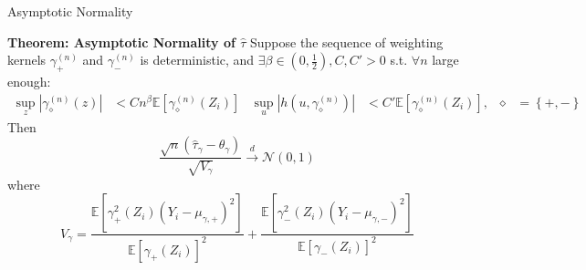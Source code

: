  \begin{frame}{Asymptotic Normality}
    \begin{block}{\textbf{Theorem: Asymptotic Normality of $\hat{\tau}$}}
        \small
        Suppose the sequence of weighting kernels $\gamma_{+}^{\left(n\right)}$ and $\gamma_{-}^{\left(n\right)}$ is deterministic, and $\exists\beta\in\left(0,\frac{1}{2}\right), C,C'>0$ s.t. $\forall n$ large enough:
        \begin{align*}
            \sup_{z}\left|\gamma_{\diamond}^{\left(n\right)}\left(z\right)\right|&<Cn^{\beta} \mathbb{E} \left[\gamma_{\diamond}^{\left(n\right)}\left(Z_{i}\right)\right] & \sup_{u}\left|h\left(u,\gamma_{\diamond}^{\left(n\right)}\right)\right|&<C'\mathbb{E}\left[\gamma_{\diamond}^{\left(n\right)}\left(Z_{i}\right)\right], & \diamond&=\left\{ +,-\right\} 
        \end{align*}
        Then 
        $$
        \frac{\sqrt{n}\left(\hat{\tau}_{\gamma}-\theta_{\gamma}\right)}{\sqrt{V_{\gamma}}}\xrightarrow{d}\mathcal{N}\left(0,1\right)
        $$
        where 
        $$
        V_{\gamma}=\frac{\mathbb{E}\left[\gamma_{+}^{2}\left(Z_{i}\right)\left(Y_{i}-\mu_{\gamma,+}\right)^{2}\right]}{\mathbb{E}\left[\gamma_{+}\left(Z_{i}\right)\right]^{2}}+\frac{\mathbb{E}\left[\gamma_{-}^{2}\left(Z_{i}\right)\left(Y_{i}-\mu_{\gamma,-}\right)^{2}\right]}{\mathbb{E}\left[\gamma_{-}\left(Z_{i}\right)\right]^{2}}
        $$
    \end{block}
    
 \end{frame}

